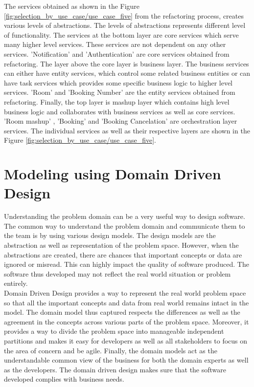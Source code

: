 The services obtained as shown in the Figure \ref{fig:selection_by_use_case/use_case_five} from the refactoring process, creates various levels of abstractions. The levels of abstractions represents different level of functionality. The services at the bottom layer are core services which serve many higher level services. These services are not dependent on any other services. 'Notification' and 'Authentication' are core services obtained from refactoring. The layer above the core layer is business layer. The business services can either have entity services, which control some related business entities or can have task services which provides some specific business logic to higher level services. 'Room' and 'Booking Number' are the entity services obtained from refactoring. Finally, the top layer is mashup layer which contains high level business logic and collaborates with business services as well as core services. 'Room mashup' , 'Booking' and 'Booking Cancelation' are orchestration layer services. The individual services as well as their respective layers are shown in the Figure \ref{fig:selection_by_use_case/use_case_five}. \cite{Fareghzadeh:2008aa}\cite{Emig:2015aa}\cite{Zimmermann:2005aa}

\section{Modeling using Domain Driven Design}\label{section:domain_driven_design/introduction}
Understanding the problem domain can be a very useful way to design software. The common way to understand the problem domain and communicate them to the team is by using various design models. The design models are the abstraction as well as representation of the problem space. However, when the abstractions are created, there are chances that important concepts or data are ignored or misread. This can highly impact the quality of software produced. The software thus developed may not reflect the real world situation or problem entirely.
\\
Domain Driven Design provides a way to represent the real world problem space so that all the important concepts and data from real world remains intact in the model. The domain model thus captured respects the differences as well as the agreement in the concepts across various parts of the problem space. Moreover, it provides a way to divide the problem space into manageable independent partitions and makes it easy for developers as well as all stakeholders to focus on the area of concern and be agile. Finally, the domain models act as the understandable common view of the business for both the domain experts as well as the developers. The domain driven design makes sure that the software developed complies with business needs.\cite{Evans:2003aa}\cite{Vernon:2013aa}
\\

